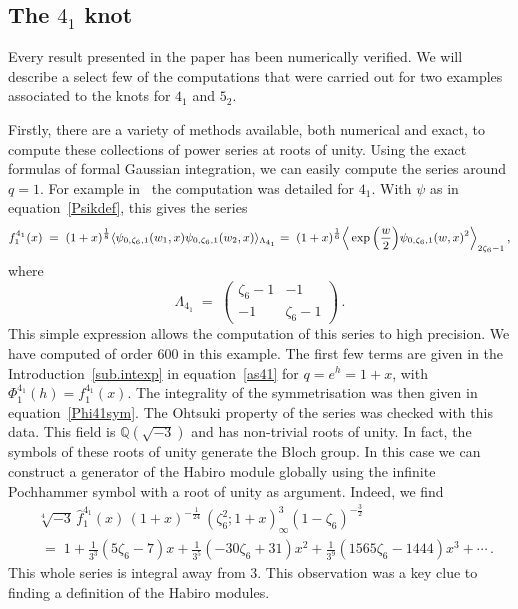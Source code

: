 \documentclass[12pt,reqno]{amsart}
\theoremstyle{definition}
\def\BQ{\mathbb Q}
\def\be{\begin{equation}}
\def\ee{\end{equation}}
\def\z{\zeta}
\def\={\;=\;}
\def\Phitof{f}
\begin{document}
\subsection{\texorpdfstring{The $4_1$ knot}{The 4\_1 knot}}


Every result presented in the paper has been numerically verified. We will describe
a select few of the computations that were carried out for two examples associated
to the knots for $4_1$ and $5_2$.

\medskip

Firstly, there are a variety of methods available, both numerical and exact, to compute
these collections of power series at roots of unity. Using the exact formulas of
formal Gaussian integration, we can easily compute the series around $q=1$.
For example in~\cite[Sec. 7]{GSW} the computation was detailed for $4_1$.
With $\psi$ as in equation~\eqref{Psikdef}, this gives the series
\be
\begin{small}
\begin{aligned}
\Phitof^{4_1}_1(x) \= (1+x)^{\frac{1}{8}}
\langle
\psi_{0,\z_6,1}(w_1,x)\psi_{0,\z_6,1}(w_2,x)\rangle_{
\Lambda_{4_1}}
=\;
(1+x)^{\frac{1}{6}}
\Big\langle
\exp\Big(\frac{w}{2}\Big)\psi_{0,\z_6,1}(w,x)^2\Big\rangle_{
2\z_6-1}\,,
\end{aligned}
\end{small}
\ee
where
\be
\Lambda_{4_1}
\=
\begin{pmatrix}
\z_6-1 & -1\\
-1 & \z_6-1
\end{pmatrix}\,.
\ee
This simple expression allows the computation of this series to high precision. We
have computed of order $600$ in this example. The first few terms are
given in the Introduction~\ref{sub.intexp} in equation~\eqref{as41} for $q=e^h=1+x$,
with $\Phi^{4_1}_1(h)=f_1^{4_1}(x)$. The integrality of
the symmetrisation was then given in equation~\eqref{Phi41sym}.
The Ohtsuki property of the series was checked with this data.
This field is $\BQ(\sqrt{-3})$ and has non-trivial roots of unity. In fact, the symbols
of these roots of unity generate the Bloch group.
In this case we can construct a generator of the
Habiro module globally using the infinite Pochhammer symbol with a root of unity as
argument. Indeed, we find
\be
\begin{aligned}
&\sqrt[4]{-3}\,\widehat{\Phitof}^{4_1}_1(x)\,(1+x)^{-\frac{1}{24}}
\,(\z_6^2;1+x)_{\infty}^{3}
(1-\z_6)^{-\frac{3}{2}}\\
&\=
1 + \frac{1}{3^3}(5\z_6 - 7)x + \frac{1}{3^5}(-30\z_6 + 31)x^2
+ \frac{1}{3^9}(1565\z_6 - 1444)x^3+\cdots\,.
\end{aligned}
\ee
This whole series is integral away from $3$. This observation was a key clue to
finding a definition of the Habiro modules.
\end{document}
